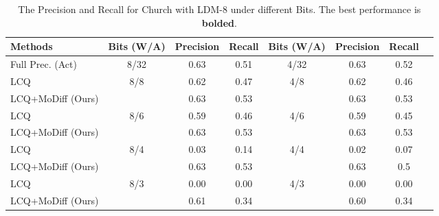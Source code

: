 \begin{table}[!ht]
\small
\centering
\caption{The Precision and Recall for Church with LDM-8 under different Bits. The best performance is \textbf{bolded}.}
\begin{tabular}{l|c|cc||c|ccc}
\toprule
{Methods} & {Bits (W/A)} & Precision & Recall & {Bits (W/A)} & Precision  & Recall & \\
\midrule
Full Prec. (Act) & 8/32 & 0.63 & 0.51 & 4/32 & 0.63 & 0.52 \\
\midrule
LCQ & \multirow{2}{*}{8/8} & 0.62 & 0.47 & \multirow{2}{*}{4/8} & 0.62 & 0.46 & \\
LCQ+MoDiff (Ours) & & 0.63 & 0.53 & & 0.63 & 0.53 & \\
\midrule
LCQ & \multirow{2}{*}{8/6}& 0.59 & 0.46 & \multirow{2}{*}{4/6}& 0.59 & 0.45 & \\
LCQ+MoDiff (Ours) & & 0.63 & 0.53 & & 0.63 & 0.53 & \\
\midrule
LCQ & \multirow{2}{*}{8/4}& 0.03 & 0.14 & \multirow{2}{*}{4/4}& 0.02 & 0.07 & \\
LCQ+MoDiff (Ours) & & 0.63 & 0.53 & & 0.63 & 0.5 & \\
\midrule
LCQ &\multirow{2}{*}{8/3} & 0.00 & 0.00 &\multirow{2}{*}{4/3} & 0.00 & 0.00 & \\
LCQ+MoDiff (Ours)& & 0.61 & 0.34 & & 0.60 & 0.34 & \\
\bottomrule
\end{tabular}
\label{tab:church_pr}
\end{table}

